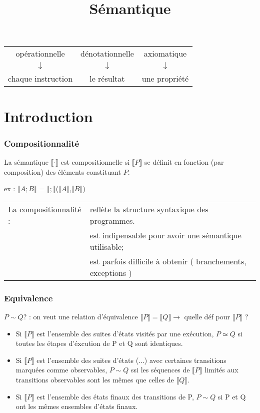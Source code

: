 \documentclass[10pt,a4paper]{article}
\title{Sémantique}
\date{}
\newcommand{\sem}[1]{$\llbracket #1 \rrbracket$}
\newcommand{\semm}[1]{\llbracket #1 \rrbracket }
\begin{document}
\makeatletter
{}
\makeatother

\maketitle


\begin{center}
\begin{tabular}{c c c}
opérationnelle & dénotationnelle & axiomatique \\
$\downarrow$ &  $\downarrow$ &  $\downarrow$ \\
chaque instruction & le résultat & une propriété \\
\end{tabular}
\end{center}



\part{Introduction}
\section{Compositionnalité}

\begin{definition}[Compositionnalité]
 La sémantique \sem{\cdot} est compositionnelle si \sem{P} se définit en fonction (par composition) des éléments constituant $P$.
\end{definition}

ex : \sem{A;B} = \sem{;}(\sem{A},\sem{B})\\

\begin{tabular}{l l}
La compositionnalité : & reflète la structure syntaxique des programmes.\\
& est indipensable pour avoir une sémantique utilisable;\\
& est parfois difficile à obtenir ( branchements, exceptions )
\end{tabular}


\section{Equivalence}
$P \sim Q ?$ : on veut une relation d'équivalence
$\semm{P} = \semm{Q} \rightarrow$ quelle déf pour \sem{P} ?\\
\begin{itemize}
\item Si \sem{P} est l'ensemble des suites d'états visités par une exécution, $P \simeq Q$ si toutes les étapes d'éxcution de P et Q sont identiques.
\item Si \sem{P} est l'ensemble des suites d'états (...) avec certaines transitions marquées comme observables, $P \sim Q$ ssi les séquences de \sem{P} limités aux transitions observables sont les mêmes que celles de \sem{Q}.
\item Si \sem{P} est l'ensemble des états finaux des transitions de P, $P \sim Q$ si P et Q ont les mêmes ensembles d'états finaux.
\end{itemize}
\end{document}
